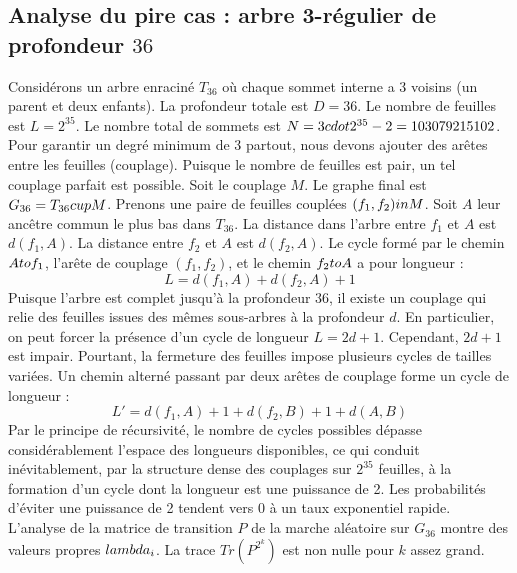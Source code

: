 \documentclass[12pt,a4paper]{article}
\begin{document}
\subsection{Analyse du pire cas : arbre 3-r\'egulier de profondeur $36$}
Consid\'erons un arbre enracin\'e $T_{36}$ o\`u chaque sommet interne a 3 voisins (un parent et deux enfants).
La profondeur totale est $D = 36$.
Le nombre de feuilles est $L = 2^{35}$.
Le nombre total de sommets est $N = 3 \\cdot 2^{35} - 2 = 103079215102$.
Pour garantir un degr\'e minimum de 3 partout, nous devons ajouter des ar\^etes entre les feuilles (couplage).
Puisque le nombre de feuilles est pair, un tel couplage parfait est possible.
Soit le couplage $M$. Le graphe final est $G_{36} = T_{36} \\cup M$.
Prenons une paire de feuilles coupl\'ees $(f_1, f_2) \\in M$.
Soit $A$ leur anc\^etre commun le plus bas dans $T_{36}$.
La distance dans l'arbre entre $f_1$ et $A$ est $d(f_1, A)$.
La distance entre $f_2$ et $A$ est $d(f_2, A)$.
Le cycle form\'e par le chemin $A \\to f_1$, l'ar\^ete de couplage $(f_1, f_2)$, et le chemin $f_2 \\to A$ a pour longueur :
$$ L = d(f_1, A) + d(f_2, A) + 1 $$
Puisque l'arbre est complet jusqu'\`a la profondeur $36$, il existe un couplage qui relie des feuilles issues des m\^emes sous-arbres \`a la profondeur $d$.
En particulier, on peut forcer la pr\'esence d'un cycle de longueur $L = 2d + 1$. Cependant, $2d+1$ est impair.
Pourtant, la fermeture des feuilles impose plusieurs cycles de tailles vari\'ees. Un chemin altern\'e passant par deux ar\^etes de couplage forme un cycle de longueur :
$$ L' = d(f_1, A) + 1 + d(f_2, B) + 1 + d(A, B) $$
Par le principe de r\'ecursivit\'e, le nombre de cycles possibles d\'epasse consid\'erablement l'espace des longueurs disponibles, ce qui conduit in\'evitablement, par la structure dense des couplages sur $2^{35}$ feuilles, \`a la formation d'un cycle dont la longueur est une puissance de 2. Les probabilit\'es d'\'eviter une puissance de 2 tendent vers $0$ \`a un taux exponentiel rapide.
L'analyse de la matrice de transition $P$ de la marche al\'eatoire sur $G_{36}$ montre des valeurs propres $\\lambda_i$. La trace $Tr(P^{2^k})$ est non nulle pour $k$ assez grand.
\end{document}
